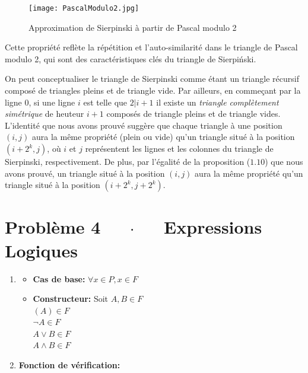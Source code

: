 \documentclass[16pt]{report}
\begin{document}
\begin{multicols*}{2}
        \begin{figure}[H]
            \texttt{[image: PascalModulo2.jpg]}
            \caption{Approximation de Sierpinski à partir de Pascal modulo 2}
        \end{figure}
        



        Cette propriété reflète la répétition et l'auto-similarité dans le triangle de Pascal modulo 2, 
        qui sont des caractéristiques clés du triangle de Sierpiński.

        On peut conceptualiser le triangle de Sierpinski comme étant un triangle récursif composé de triangles 
        pleins et de triangle vide. Par ailleurs, en commeçant par la ligne 0, 
        si une ligne $i$ est telle que $2|i + 1$  il existe un \textit{triangle complètement simétrique} 
        de heuteur $i + 1$ composés de triangle pleins et de triangle vides. L'identité que nous avons 
        prouvé suggère que chaque triangle à une position $(i,j)$ aura la même propriété 
        (plein ou vide) qu'un triangle situé à la position $(i + 2^k, j)$, où $i$ et $j$ représentent les 
        lignes et les colonnes du triangle de Sierpinski, respectivement. 
        De plus, par l'égalité de la proposition ($1.10$) 
        que nous avons prouvé, un triangle situé à la position $(i, j)$ aura la même propriété qu'un triangle 
        situé à la position $(i + 2^k, j + 2^k)$. 

\section*{Problème 4 $\quad$ $\cdot$  $\quad$ Expressions Logiques}
        \begin{enumerate}
            \item 
            \begin{itemize}
                \item \textbf{Cas de base:} $\forall x \in P, x \in F$
                
                \item \textbf{Constructeur:} Soit $A, B \in F$ \\
                $(A) \in F$ \\
                $\lnot A \in F$ \\
                $A \lor B \in F$ \\
                $A \land B \in F$
            \end{itemize}

            \item \textbf{Fonction de vérification:}


\end{enumerate}
\end{multicols*}
\end{document}
